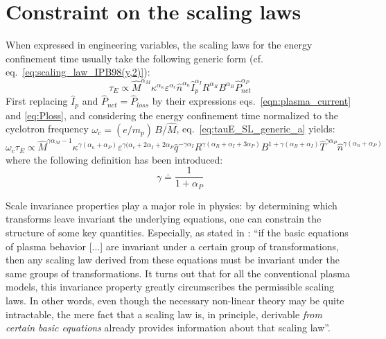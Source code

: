 \chapter{Constraint on the scaling laws}
\label{appendix:scaling_law_dimensionless}

When expressed in engineering variables, the scaling laws for the energy confinement time usually take the following generic form (cf. eq.~\eqref{eq:scaling_law_IPB98(y,2)}):
\begin{equation}
  \label{eq:tauE_SL_generic_a}
  \tau_E \propto \hat M^{\alpha_M} \kappa^{\alpha_\kappa} \varepsilon^{\alpha_\epsilon} \hat n^{\alpha_n} \hat I_p^{\alpha_I} R^{\alpha_R} B^{\alpha_B} \hat P_{net}^{\alpha_P}
\end{equation}
First replacing $\hat I_p$ and $\hat P_{net} = \hat P_{loss}$ by their expressions eqs.~\eqref{eqn:plasma_current} and \eqref{eq:Ploss}, and considering the energy confinement time normalized to the cyclotron frequency $\omega_c = (e/m_p)\, B/\hat M$, eq.~\eqref{eq:tauE_SL_generic_a} yields:
\begin{equation}
\label{eq:tauE_SL_generic_b}
  \omega_c \tau_E \propto 
  \hat M^{\gamma\alpha_M - 1} 
  \kappa^{\gamma(\alpha_\kappa+\alpha_P)} 
  \varepsilon^{\gamma(\alpha_\epsilon+2\alpha_I+2\alpha_P} 
  \hat q^{-\gamma\alpha_I} 
  R^{\gamma(\alpha_R+\alpha_I+3\alpha_P)} 
  B^{1 + \gamma(\alpha_B+\alpha_I)} 
  \hat T^{\gamma\alpha_P}
  \hat n^{\gamma(\alpha_n+\alpha_P)} 
\end{equation}
where the following definition has been introduced:
$$ 
  \gamma \doteq \frac{1}{1+\alpha_P}
$$

Scale invariance properties play a major role in physics: by determining which transforms leave invariant the underlying equations, one can constrain the structure of some key quantities. Especially, as stated in \cite{Connor1977}: ``if the basic equations of plasma behavior [...] are invariant under a certain group of transformations, then any scaling law derived from these equations must be invariant under the same groups of transformations. It turns out that for all the conventional plasma models, this invariance property greatly circumscribes the permissible scaling laws. In other words, even though the necessary non-linear theory may be quite intractable, the mere fact that a scaling law is, in principle, derivable \emph{from certain basic equations} already provides information about that scaling law''.

